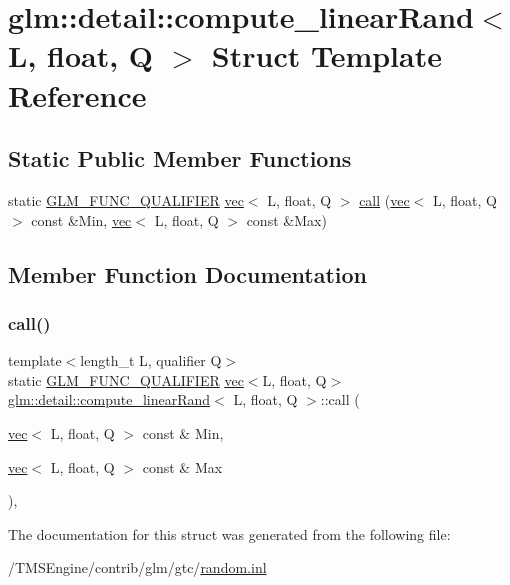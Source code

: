 \hypertarget{structglm_1_1detail_1_1compute__linear_rand_3_01_l_00_01float_00_01_q_01_4}{}\section{glm\+:\+:detail\+:\+:compute\+\_\+linear\+Rand$<$ L, float, Q $>$ Struct Template Reference}
\label{structglm_1_1detail_1_1compute__linear_rand_3_01_l_00_01float_00_01_q_01_4}
\subsection*{Static Public Member Functions}
\begin{DoxyCompactItemize}
\item 
static \hyperlink{setup_8hpp_a33fdea6f91c5f834105f7415e2a64407}{G\+L\+M\+\_\+\+F\+U\+N\+C\+\_\+\+Q\+U\+A\+L\+I\+F\+I\+ER} \hyperlink{structglm_1_1vec}{vec}$<$ L, float, Q $>$ \hyperlink{structglm_1_1detail_1_1compute__linear_rand_3_01_l_00_01float_00_01_q_01_4_a3319a6af7a1c260138de2d75152e56a6}{call} (\hyperlink{structglm_1_1vec}{vec}$<$ L, float, Q $>$ const \&Min, \hyperlink{structglm_1_1vec}{vec}$<$ L, float, Q $>$ const \&Max)
\end{DoxyCompactItemize}


\subsection{Member Function Documentation}
\mbox{\label{structglm_1_1detail_1_1compute__linear_rand_3_01_l_00_01float_00_01_q_01_4_a3319a6af7a1c260138de2d75152e56a6}} 
\subsubsection{\texorpdfstring{call()}{call()}}
{\footnotesize\ttfamily template$<$length\+\_\+t L, qualifier Q$>$ \\
static \hyperlink{setup_8hpp_a33fdea6f91c5f834105f7415e2a64407}{G\+L\+M\+\_\+\+F\+U\+N\+C\+\_\+\+Q\+U\+A\+L\+I\+F\+I\+ER} \hyperlink{structglm_1_1vec}{vec}$<$L, float, Q$>$ \hyperlink{structglm_1_1detail_1_1compute__linear_rand}{glm\+::detail\+::compute\+\_\+linear\+Rand}$<$ L, float, Q $>$\+::call (\begin{DoxyParamCaption}\item[{\hyperlink{structglm_1_1vec}{vec}$<$ L, float, Q $>$ const \&}]{Min,  }\item[{\hyperlink{structglm_1_1vec}{vec}$<$ L, float, Q $>$ const \&}]{Max }\end{DoxyParamCaption})\hspace{0.3cm}{\ttfamily [inline]}, {\ttfamily [static]}}



The documentation for this struct was generated from the following file\+:\begin{DoxyCompactItemize}
\item 
/\+T\+M\+S\+Engine/contrib/glm/gtc/\hyperlink{random_8inl}{random.\+inl}\end{DoxyCompactItemize}
